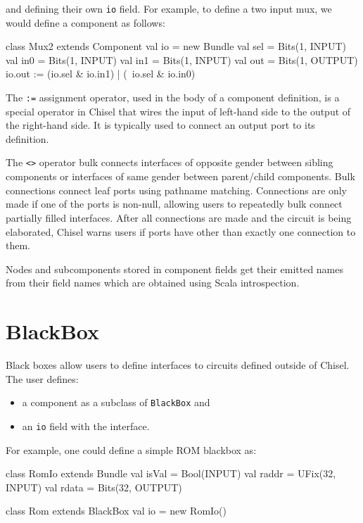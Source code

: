\documentclass[10pt,twocolumn]{article}
\def\code#1{{\small\tt #1}}
\begin{document}
\noindent
and defining their own \code{io} field.  For example, to define a two
input mux, we would define a component as follows:

\begin{scala}
class Mux2 extends Component {
  val io = new Bundle{
    val sel = Bits(1, INPUT)
    val in0 = Bits(1, INPUT)
    val in1 = Bits(1, INPUT)
    val out = Bits(1, OUTPUT)
  }
  io.out := (io.sel & io.in1) | (~io.sel & io.in0)
}
\end{scala}

\noindent
The \code{:=} assignment operator, used in the body of a
component definition, is a special operator in Chisel that wires the input of
left-hand side to the output of the right-hand side.  It is typically
used to connect an output port to its definition.

The \code{<>} operator bulk connects interfaces of opposite gender between
sibling components or interfaces of same gender between parent/child components. 
Bulk connections connect leaf ports using pathname matching.
Connections are only made if one of the ports is non-null,
allowing users to repeatedly bulk connect partially filled interfaces.
After all connections are made and the circuit is being elaborated,
Chisel warns users if ports have other than exactly one connection to them.

Nodes and subcomponents stored in component fields get their emitted
names from their field names which are obtained using Scala introspection.


\section{BlackBox}

Black boxes allow users to define interfaces to circuits defined
outside of Chisel.  The user defines:

\begin{itemize}
\item a component as a subclass of \code{BlackBox} and
\item an \code{io} field with the interface.
\end{itemize}

\noindent
For example, one could define a simple ROM blackbox as:

\begin{scala}
class RomIo extends Bundle {
  val isVal = Bool(INPUT)
  val raddr = UFix(32, INPUT)
  val rdata = Bits(32, OUTPUT)
}

class Rom extends BlackBox {
  val io = new RomIo()
}
\end{scala}
\end{document}
